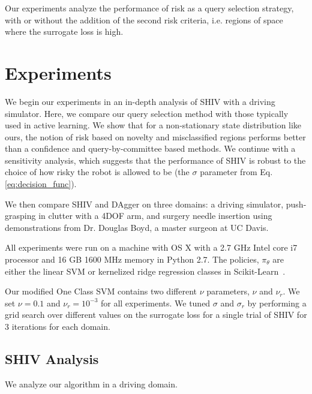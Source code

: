 \documentclass[10pt, conference]{ieeeconf}      %
\begin{document}
Our experiments analyze the performance of risk as a query selection strategy, with or without the addition of the second risk criteria, i.e. regions of space where the surrogate loss is high.



\section{Experiments}

We begin our experiments in an in-depth analysis of SHIV with a driving simulator. Here, we compare our query selection method with those typically used in active learning. We show that for a non-stationary state distribution like ours, the notion of risk based on novelty and misclassified regions performs better than a confidence and query-by-committee based methods. We continue with a sensitivity analysis, which suggests that the performance of SHIV is robust to the choice of how risky the robot is allowed to be (the $\sigma$ parameter from Eq. \ref{eq:decision_func}).

We then compare SHIV and DAgger on three domains: a driving simulator, push-grasping in clutter with a 4DOF arm, and surgery needle insertion using demonstrations from Dr. Douglas Boyd, a master surgeon at UC Davis. 

All experiments were run on a machine with OS X with a 2.7 GHz Intel core i7 processor and 16 GB
1600 MHz memory in Python 2.7. The policies, $\pi_\theta$ are either the linear SVM or  kernelized ridge regression classes in Scikit-Learn~\cite{scikit-learn}.

Our modified One Class SVM contains two different $\nu$ parameters, $\nu$ and $\nu_r$. We set $\nu = 0.1$ and $\nu_r =10^{-3}$ for all experiments. We tuned $\sigma$ and $\sigma_r$ by performing a grid search over different values on the surrogate loss for a single trial of SHIV for 3 iterations for each domain.


\subsection{SHIV Analysis}\label{sec:car}
We analyze our algorithm in a driving domain.
\end{document}

